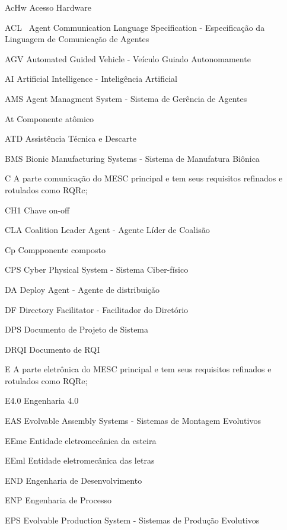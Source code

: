 \documentclass[
12pt,				%
openright,			%
oneside,			%
a4paper,			%
english,			%
brazil				%
]{abntex2}
\begin{document}
\listoftables*
\cleardoublepage
\begin{siglas}
	
\item[AcHw] Acesso Hardware
\item[ACL ]~Agent Communication Language Specification - Especificação da Linguagem de Comunicação de Agentes
\item[AGV] Automated Guided Vehicle - Veículo Guiado Autonomamente
\item[AI] Artificial Intelligence - Inteligência Artificial
\item[AMS ]Agent Managment System - Sistema de Gerência de Agentes
\item[At] Componente atômico
\item[ATD] Assistência Técnica e Descarte
\item[BMS] Bionic Manufacturing Systems - Sistema de Manufatura Biônica
\item[C] A parte comunicação do MESC principal e tem seus requisitos refinados e rotulados como RQRc;
\item[CH1] Chave on-off
\item[CLA] Coalition Leader Agent - Agente Líder de Coalisão
\item[Cp] Compponente composto
\item[CPS] Cyber Physical System - Sistema Ciber-físico
\item[DA] Deploy Agent - Agente de distribuição 
\item[DF] Directory Facilitator - Facilitador do Diretório
\item[DPS] Documento de Projeto de Sistema
\item[DRQI] Documento de RQI
\item[E] A parte eletrônica do MESC principal e tem seus requisitos refinados e rotulados como RQRe;
\item[E4.0] Engenharia 4.0
\item[EAS] Evolvable Assembly Systems - Sistemas de Montagem Evolutivos
\item[EEme] Entidade eletromecânica da esteira
\item[EEml] Entidade eletromecânica das letras
\item[END] Engenharia de Desenvolvimento
\item[ENP] Engenharia de Processo
\item[EPS] Evolvable Production System - Sistemas de Produção Evolutivos

\end{siglas}
\end{document}
